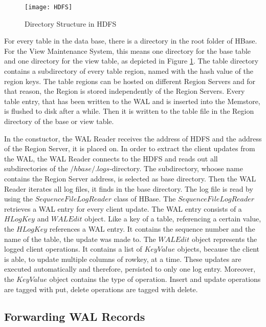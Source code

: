 \documentclass[11pt,a4paper,bibtotoc,idxtotoc,headsepline,footsepline,footexclude,BCOR12mm,DIV13]{scrbook}
\begin{document}
\begin{figure}[h!]
  
  \centering
    \texttt{[image: HDFS]}
    \caption{Directory Structure in HDFS}
    \label{fig:hdfs}
\end{figure}


For every table in the data base, there is a directory in the root folder of HBase. For the View Maintenance System, this means one directory for the base table and one directory for the view table, as depicted in Figure \ref{fig:hdfs}. The table directory contains a subdirectory of every table region, named with the hash value of the region keys. The table regions can be hosted on different Region Servers and for that reason, the Region is stored independently of the Region Servers. Every table entry, that has been written to the WAL and is inserted into the Memstore, is flushed to disk after a while.  Then it is written to the table file in the Region directory of the base or view table. 


In the constuctor, the WAL Reader receives the address of HDFS and the address of the Region Server, it is placed on. In order to extract the client updates from the WAL, the WAL Reader connects to the HDFS and reads out all subdirectories of the $/hbase/.logs$-directory. The subdirectory, whoose name contains the Region Server address, is selected as base directory. Then the WAL Reader iterates all log files, it finds in the base directory. The log file is read by using the $SequenceFileLogReader$ class of HBase. The $SequenceFileLogReader$ retrieves a WAL entry for every client update. The WAL entry consists of a $HLogKey$ and $WALEdit$ object. Like a key of a table, referencing a certain value, the $HLogKey$ references a WAL entry. It contains the sequence number and the name of the table, the update was made to. The $WALEdit$ object represents the logged client operations. It contains a list of $KeyValue$ objects, because the client is able, to update multiple columns of rowkey, at a time. These updates are executed automatically and therefore, persisted to only one log entry. Moreover, the $KeyValue$ object contains the type of operation. Insert and update operations are tagged with put, delete operations are tagged with delete. 

\subsection{Forwarding WAL Records}
\end{document}
